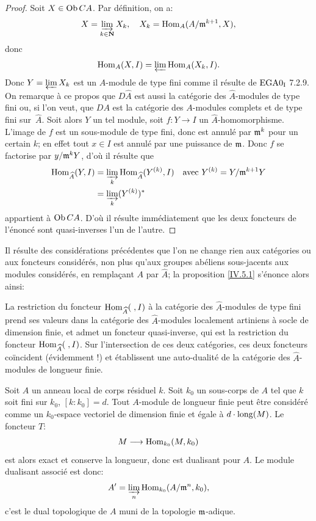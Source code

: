 \begin{proof}
Soit $X\in \operatorname{Ob} CA$. Par d\'efinition, on a:
$$
X=\varinjlim_{k\in {\bf N}}X_{k}, \quad X_{k}=\operatorname{Hom}_{A}(A/\mathfrak{m}^{k+1}, X),
$$
donc
$$
\operatorname{Hom}_{A}(X, I)=\varprojlim \operatorname{Hom}_{A}(X_{k}, I).
$$
Donc $Y=\varprojlim X_{k}$ est un $\hat{A}$-module de type fini comme il r\'esulte de $\textup{EGA}\space 0_{\textup{I}}$ 7.2.9. On remarque \`a ce propos que $D\hat{A}$ est aussi la cat\'egorie des $\hat{A}$-modules de type fini ou, si l'on veut, que $DA$ est la cat\'egorie des $A$-modules complets et de type fini sur~$\hat{A}$. Soit alors $Y$ un tel module, soit $f:Y\to I$ un $\hat{A}$-homomorphisme. L'image de $f$ est un sous-module de type fini, donc est annul\'e par $\mathfrak{m}^{k}$ pour un certain $k$; en effet tout $x\in I$ est annul\'e par une puissance de $\mathfrak{m}$. Donc $f$ se factorise par $y/\mathfrak{m}^{k}Y$, d'o\`u il r\'esulte que
\begin{align*}
\operatorname{Hom}_{\widehat{A}}(Y, I)&=\varinjlim_k\operatorname{Hom}_{\widehat{A}}(Y^{(k)}, I)\quad\text{avec } Y^{(k)}=Y/\mathfrak{m}^{k+1}Y\\
&=\varinjlim_k(Y^{(k)})^*
\end{align*}
appartient \`a $\operatorname{Ob} CA$. D'o\`u il r\'esulte imm\'ediatement que les deux foncteurs de l'\'enonc\'e sont quasi-inverses l'un de l'autre.
\skipqed
\end{proof}

Il r\'esulte des consid\'erations pr\'ec\'edentes que l'on ne change rien
aux cat\'egories ou aux foncteurs consid\'er\'es, non plus qu'aux
groupes ab\'eliens sous-jacents aux modules consid\'er\'es, en rempla\c
cant $A$ par $\hat{A}$; la proposition \ref{IV.5.1} s'\'enonce alors ainsi:

La restriction du foncteur $\operatorname{Hom}_{\widehat{A}}(\;, I)$ \`a la cat\'egorie des $\hat{A}$-modules de type fini prend ses valeurs dans la cat\'egorie des $\hat{A}$-modules localement artiniens \`a socle de dimension finie, et admet un foncteur quasi-inverse, qui est la restriction du foncteur $\operatorname{Hom}_{\widehat{A}}(\;, I)$. Sur l'intersection de ces deux cat\'egories, ces deux foncteurs co\"incident (\'evidemment !) et \'etablissent une auto-dualit\'e de la cat\'egorie des $\hat{A}$-modules de longueur finie.

\begin{exemple}[MACAULAY]
\label{IV.5.2} Soit $A$ un anneau local de corps r\'esiduel $k$. Soit $k_{0}$ un sous-corps de $A$ tel que $k$ soit fini sur $k_{0}$, $[k:k_{0}]=d$. Tout $A$-module de longueur finie peut \^etre consid\'er\'e comme un $k_{0}$-espace vectoriel de dimension finie et \'egale \`a $d\cdot\operatorname{long}(M)$. Le foncteur $T$:
$$
M\to \Hom_{k_{0}}(M, k_{0})
$$
est alors exact et conserve la longueur, donc est dualisant pour $A$. Le module dualisant associ\'e est donc:
$$
A'=\varinjlim_{n}\operatorname{Hom}_{k_{0}}(A/\mathfrak{m}^{n}, k_{0}),
$$
c'est le dual topologique de $A$ muni de la topologie $\mathfrak{m}$-adique.
\end{exemple}

